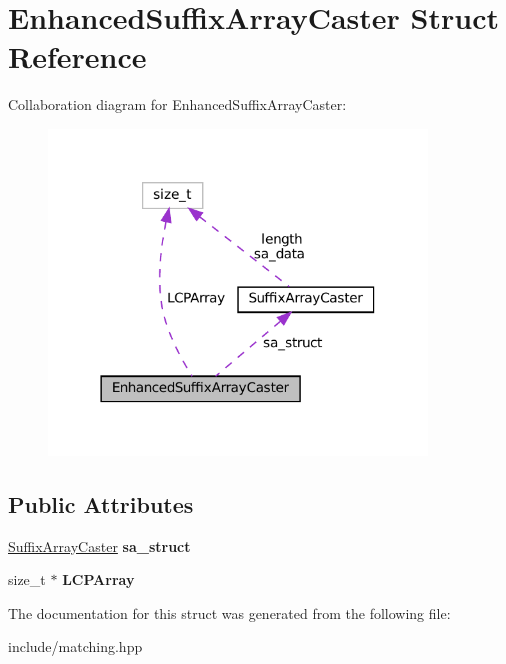 \hypertarget{structEnhancedSuffixArrayCaster}{}\section{Enhanced\+Suffix\+Array\+Caster Struct Reference}
\label{structEnhancedSuffixArrayCaster}


Collaboration diagram for Enhanced\+Suffix\+Array\+Caster\+:\nopagebreak
\begin{figure}[H]
\begin{center}
\leavevmode
\includegraphics[width=285pt]{structEnhancedSuffixArrayCaster__coll__graph}
\end{center}
\end{figure}
\subsection*{Public Attributes}
\begin{DoxyCompactItemize}
\item 
\mbox{\label{structEnhancedSuffixArrayCaster_acb3af842c32fba480dad8d0323e0923c}} 
\mbox{\hyperlink{structSuffixArrayCaster}{Suffix\+Array\+Caster}} {\bfseries sa\+\_\+struct}
\item 
\mbox{\label{structEnhancedSuffixArrayCaster_ab99fa020e1f4e2b2c3b9c08a3d65dc30}} 
size\+\_\+t $\ast$ {\bfseries L\+C\+P\+Array}
\end{DoxyCompactItemize}


The documentation for this struct was generated from the following file\+:\begin{DoxyCompactItemize}
\item 
include/matching.\+hpp\end{DoxyCompactItemize}
